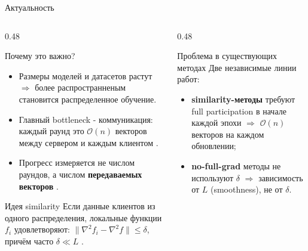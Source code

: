 \documentclass[10pt,aspectratio=169,t]{beamer}
\begin{document}
\begin{frame}{Актуальность}
\begin{columns}[T,onlytextwidth]
\begin{column}{0.48\textwidth}
\begin{block}{Почему это важно?}
\begin{itemize}
  \item Размеры моделей и датасетов растут \citep{kaplan2020scaling} $\Rightarrow$ более распространненым становится распределенное обучение.
  \item Главный bottleneck - коммуникация: каждый раунд это $\mathcal{O}(n)$ векторов между сервером и каждым клиентом \citep{konevcny2016federated,kairouz2021advances}.
  \item Прогресс измеряется не числом раундов, а числом \textbf{передаваемых векторов} \citep{arjevani2015communication}.
\end{itemize}
\end{block}

\vspace{2mm}
\begin{block}{Идея similarity}
Если данные клиентов из одного распределения, локальные функции $f_i$ удовлетворяют: $\|\nabla^2 f_i - \nabla^2 f\| \le \delta$, причём часто $\delta \ll L$ \citep{hendrikx2020statistically}.
\end{block}
\end{column}

\begin{column}{0.48\textwidth}
\begin{block}{Проблема в существующих методах}
Две независимые линии работ:
\begin{itemize}
  \item \textbf{similarity-методы} \citep{lin2023stochastic,kovalev2022optimal} требуют full participation в начале каждой эпохи $\Rightarrow$ $\mathcal{O}(n)$ векторов на каждом обновлении;
  \item \textbf{no-full-grad} методы \citep{li2021zerosarah,medyakov2025variance} не используют $\delta$ $\Rightarrow$ зависимость от $L$ (smoothness), не от $\delta$.
\end{itemize}
\end{block}
\end{column}
\end{columns}
\end{frame}
\end{document}
